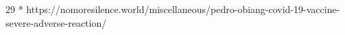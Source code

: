          {
          }
          {
            29
          }
          {
          }
          {
            *
          }
          {
          }
          {
            https://nomoresilence.world/miscellaneous/pedro-obiang-covid-19-vaccine-severe-adverse-reaction/
          }

